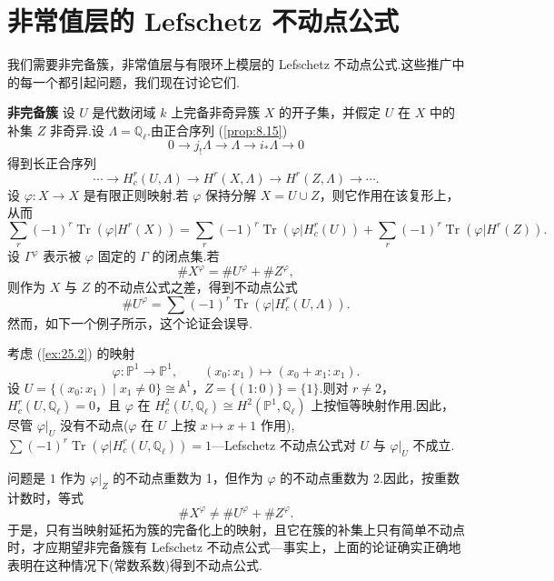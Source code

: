 ﻿%
\chapter{非常值层的 Lefschetz 不动点公式}\label{sec:29}

我们需要非完备簇，非常值层与有限环上模层的 Lefschetz 不动点公式.这些推广中的每一个都引起问题，我们现在讨论它们.

\textbf{非完备簇} 设 $U$ 是代数闭域 $k$ 上完备非奇异簇 $X$ 的开子集，并假定 $U$ 在 $X$ 中的补集 $Z$ 非奇异.设 $\Lambda = \mathbb{Q}_{\ell}$.由正合序列 (\ref{prop:8.15})
\[
0 \to j_{!}\Lambda \to \Lambda \to i_{*}\Lambda \to 0
\]
得到长正合序列
\[
\cdots \to H^{r}_{c}(U, \Lambda) \to H^{r}(X, \Lambda) \to H^{r}(Z, \Lambda) \to \cdots.
\]
设 $\varphi \colon X \to X$ 是有限正则映射.若 $\varphi$ 保持分解 $X = U \cup Z$，则它作用在该复形上，从而
\[
\sum_{r} (-1)^{r} \operatorname{Tr}(\varphi|H^{r}(X)) = \sum_{r} (-1)^{r} \operatorname{Tr}(\varphi|H^{r}_{c}(U)) + \sum_{r} (-1)^{r} \operatorname{Tr}(\varphi|H^{r}(Z)).
\]
设 $\Gamma^{\varphi}$ 表示被 $\varphi$ 固定的 $\Gamma$ 的闭点集.若
\[
\#X^{\varphi} = \#U^{\varphi} + \#Z^{\varphi},
\]
则作为 $X$ 与 $Z$ 的不动点公式之差，得到不动点公式
\[
\#U^{\varphi} = \sum (-1)^{r} \operatorname{Tr}(\varphi|H^{r}_{c}(U, \Lambda)).
\]
然而，如下一个例子所示，这个论证会误导.

\begin{example}\label{ex:29.1}
考虑 (\ref{ex:25.2}) 的映射
\[
\varphi \colon \mathbb{P}^{1} \to \mathbb{P}^{1}, \qquad (x_0 \colon x_1) \mapsto (x_0 + x_1 \colon x_1).
\]
设 $U = \{(x_0 \colon x_1) \mid x_1 \neq 0\} \cong \mathbb{A}^{1}$，$Z = \{(1 \colon 0)\} = \{1\}$.则对 $r \neq 2$，$H^{r}_{c}(U, \mathbb{Q}_{\ell}) = 0$，且 $\varphi$ 在 $H^{2}_{c}(U, \mathbb{Q}_{\ell}) \cong H^{2}(\mathbb{P}^{1}, \mathbb{Q}_{\ell})$ 上按恒等映射作用.因此，尽管 $\varphi|_{U}$ 没有不动点($\varphi$ 在 $U$ 上按 $x \mapsto x + 1$ 作用), $\sum (-1)^{r} \operatorname{Tr}(\varphi|H^{r}_{c}(U, \mathbb{Q}_{\ell})) = 1$---Lefschetz 不动点公式对 $U$ 与 $\varphi|_{U}$ 不成立.

问题是 $1$ 作为 $\varphi|_{Z}$ 的不动点重数为 1，但作为 $\varphi$ 的不动点重数为 2.因此，按重数计数时，等式
\[
\#X^{\varphi} \neq \#U^{\varphi} + \#Z^{\varphi}.
\]
于是，只有当映射延拓为簇的完备化上的映射，且它在簇的补集上只有简单不动点时，才应期望非完备簇有 Lefschetz 不动点公式---事实上，上面的论证确实正确地表明在这种情况下(常数系数)得到不动点公式.
\end{example}

